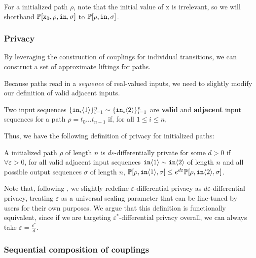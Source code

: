 For a initialized path $\rho$, note that the initial value of $\texttt{x}$ is irrelevant, so we will shorthand $\mathbb{P}[\texttt{x}_0, \rho, \texttt{in}, \sigma]$ to $\mathbb{P}[\rho, \texttt{in}, \sigma]$.


\subsubsection{Privacy}

By leveraging the construction of couplings for individual transitions, we can construct a set of approximate liftings for paths.

Because paths read in a \textit{sequence} of real-valued inputs, we need to slightly modify our definition of valid adjacent inputs.

\begin{defn}
    Two input sequences $\{\texttt{in}_i\langle1 \rangle\}_{i=1}^n\sim\{\texttt{in}_i\langle2 \rangle\}_{i=1}^n$ are \textbf{valid} and \textbf{adjacent} input sequences for a path $\rho = t_0\ldots t_{n-1}$ if, for all $1\leq i\leq n$, 
\end{defn}

Thus, we have the following definition of privacy for initialized paths:

\begin{defn}
    A initialized path $\rho$ of length $n$ is $d\varepsilon$-differentially private for some $d>0$ if $\forall \varepsilon>0$, for all valid adjacent input sequences $\texttt{in}\langle1 \rangle\sim \texttt{in}\langle2 \rangle$ of length $n$ and all possible output sequences $\sigma$ of length $n$, $\mathbb{P}[\rho, \texttt{in}\langle1 \rangle, \sigma]\leq e^{d\varepsilon}\mathbb{P}[\rho, \texttt{in}\langle2 \rangle, \sigma]$.
\end{defn}

Note that, following \cite{chadhaLinearTimeDecidability2021}, we slightly redefine $\varepsilon$-differential privacy as $d\varepsilon$-differential privacy, treating $\varepsilon$ as a universal scaling parameter that can be fine-tuned by users for their own purposes. 
We argue that this definition is functionally equivalent, since if we are targeting $\varepsilon^*$-differential privacy overall, we can always take $\varepsilon = \frac{\varepsilon^*}{d}$.

\subsubsection{Sequential composition of couplings}

